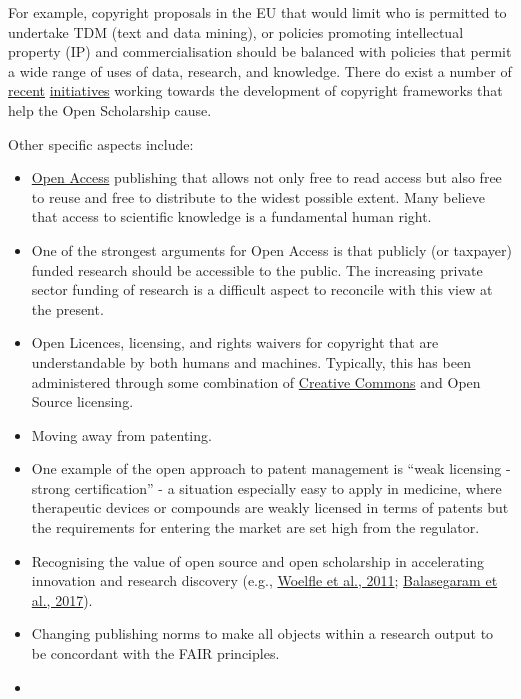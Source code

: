 For example, copyright proposals in the EU that would limit who is
permitted to undertake TDM (text and data mining), or policies promoting
intellectual property (IP) and commercialisation should be balanced with
policies that permit a wide range of uses of data, research, and
knowledge. There do exist a number of
\href{https://www.communia-association.org/}{recent}
\href{https://fixcopyright.eu/}{initiatives} working towards the
development of copyright frameworks that help the Open Scholarship
cause.

Other specific aspects include:

\begin{itemize}
\item
  \href{bit.ly/oa-book}{Open Access} publishing that allows not only
  free to read access but also free to reuse and free to distribute to
  the widest possible extent. Many believe that access to scientific
  knowledge is a fundamental human right.
\item
  One of the strongest arguments for Open Access is that publicly (or
  taxpayer) funded research should be accessible to the public. The
  increasing private sector funding of research is a difficult aspect to
  reconcile with this view at the present.
\item
  Open Licences, licensing, and rights waivers for copyright that are
  understandable by both humans and machines. Typically, this has been
  administered through some combination of
  \href{https://creativecommons.org/faq/\#what-does-it-mean-that-creative-commons-licenses-are-machine-readable}{Creative
  Commons} and Open Source licensing.
\item
  Moving away from patenting.
\item
  One example of the open approach to patent management is ``weak
  licensing - strong certification'' - a situation especially easy to
  apply in medicine, where therapeutic devices or compounds are weakly
  licensed in terms of patents but the requirements for entering the
  market are set high from the regulator.
\item
  Recognising the value of open source and open scholarship in
  accelerating innovation and research discovery (e.g.,
  \href{https://doi.org/10.1038/nchem.1149}{Woelfle et al., 2011};
  \href{https://doi.org/10.1371/journal.pmed.1002276}{Balasegaram et
  al., 2017}).
\item
  Changing publishing norms to make all objects within a research output
  to be concordant with the FAIR principles.
\item

\end{itemize}
